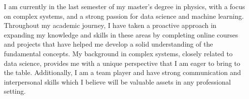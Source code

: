 \documentclass[9pt, purple]{./template/cv} %
\begin{document}
I am currently in the last semester of my master's degree in physics, with a focus on complex systems, and a strong passion for data science and machine learning. Throughout my academic journey, I have taken a proactive approach in expanding my knowledge and skills in these areas by completing online courses and projects that have helped me develop a solid understanding of the fundamental concepts. My background in complex systems, closely related to data science, provides me with a unique perspective that I am eager to bring to the table. 
Additionally, I am a team player and have strong communication and interpersonal skills which I believe will be valuable assets in any professional setting.
\vspace{-3mm}

\end{document}
